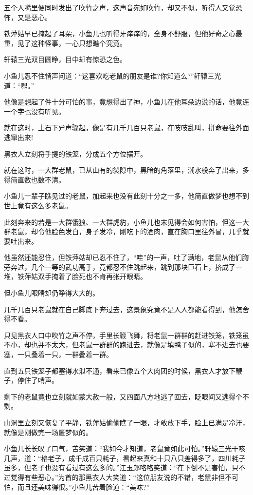 \documentclass[12pt,oneside]{book}
\begin{document}
五个人嘴里便同时发出了吹竹之声，这声音宛如吹竹，却又不似，听得人又觉恐怖，又是恶心。

铁萍姑早已掩起了耳朵，小鱼儿也听得牙痒痒的，全身不舒服，但他好奇之心最重，见了这种怪事，一心只想瞧个究竟。

轩辕三光双目圆睁，目中却有惊恐之色。

小鱼儿忍不住悄声问道：``这喜欢吃老鼠的朋友是谁?你知道么?''轩辕三光道：``嗯。''

他像是想起了件十分可怕的事，竟想得出了神，小鱼儿在他耳朵边说的话，他竟连一个字也没有听见。

就在这时，土石下异声骤起，像是有几千几百只老鼠，在吱吱乱叫，拼命要往外面逃窜出来!

黑衣人立刻将手提的铁笼，分成五个方位摆开。

就在这时，一大群老鼠，已从山有的裂隙中，黑暗的角落里，潮水般奔了出来，多得简直数也数不清。

小鱼儿一辈子瞧见过的老鼠，加起来也没有此刻十分之一多，他简直做梦也想不到世上竟有这么多老鼠。

此刻奔来的若是一大群饿狼、一大群虎豹，小鱼儿也末见得会如何害怕，但这一大群老鼠，却令他脸色发白，身子发冷，刚吃下的酒肉，直在胸口里往外冒，几乎就要吐出来。

他虽然还能忍住，但铁萍姑却已忍不住了，``哇''的一声，吐了满地，老鼠从他们胸旁奔过，几个一等的武功高手，竟都忍不住跳起来，跳到那块巨石上，挤成了一堆，铁萍姑双手掩着了脸死也不肯再张开眼睛。

但小鱼儿眼睛却仍睁得大大的。

几千几百只老鼠就在自己脚底下奔过去，这景象究竟不是人人都能看得到，他怎舍得不看。

只见黑衣人口中吹竹之声不停，手里长鞭飞舞，将老鼠一群群的赶进铁笼，铁笼虽不小，却也并不太大，但老鼠一群群的跑进去，就像是填鸭子似的，塞不进去也要塞，一只叠着一只，一群叠着一群。

直到五只铁笼子都塞得水泄不通，看来已像五个大肉团的时候，黑衣人才放下鞭子，停住了哨声。

剩下的老鼠竟也立刻就如蒙大赦一般，又四面八方地逃了回去，眨眼间又逃得个不剩。

山洞里立刻又恢复了平静，铁萍姑偷偷瞧了一眼，才敢放下手，脸上已满是冷汗，就像是刚做完一场噩梦似的。

小鱼儿长长叹了口气，苦笑道：``我如今才知道，老鼠竟如此可怕。''轩辕三光干咳几声，道：``格老子，成千成百只耗子，看起来真和十只八只差得多了，四川耗子虽多，但老子也没有看过有这么多的。''江玉郎咯咯笑道：``在下倒不是害怕，只不过觉得有些恶心。''为首的那黑衣人大笑道：``这位朋友说的不错，老鼠非但不可怕，而且还美味得很。''小鱼儿苦着脸道：``美味?''
\end{document}
